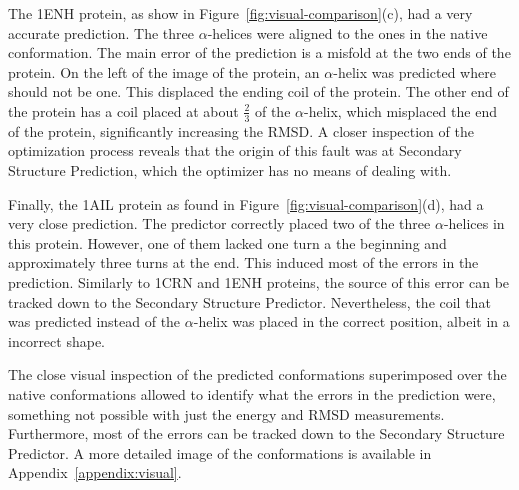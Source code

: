 The 1ENH protein, as show in Figure~\ref{fig:visual-comparison}(c),
had a very accurate prediction. The three $\alpha$-helices were aligned to the ones in the native conformation. The main error of the prediction is a misfold at the two ends of the protein. On the left of the image of the protein, an $\alpha$-helix was predicted where should not be one. This displaced the ending coil of the protein. The other end of the protein has a coil placed at about $\frac{2}{3}$ of the $\alpha$-helix, which misplaced the end of the protein, significantly increasing the \ac{RMSD}. A closer inspection of the optimization process reveals that the origin of this fault was at Secondary Structure Prediction, which the optimizer has no means of dealing with.

Finally, the 1AIL protein as found in Figure~\ref{fig:visual-comparison}(d), had a very close prediction. The predictor correctly placed two of the three $\alpha$-helices in this protein. However, one of them lacked one turn a the beginning and approximately three turns at the end. This induced most of the errors in the prediction. Similarly to 1CRN and 1ENH proteins, the source of this error can be tracked down to the Secondary Structure Predictor. Nevertheless, the coil that was predicted instead of the $\alpha$-helix was placed in the correct position, albeit in a incorrect shape.

The close visual inspection of the predicted conformations superimposed over the native conformations allowed to identify what the errors in the prediction were, something not possible with just
the energy and \ac{RMSD} measurements. Furthermore, most of the errors
can be tracked down to the Secondary Structure Predictor.
A more detailed image of the conformations is available in Appendix~\ref{appendix:visual}.
